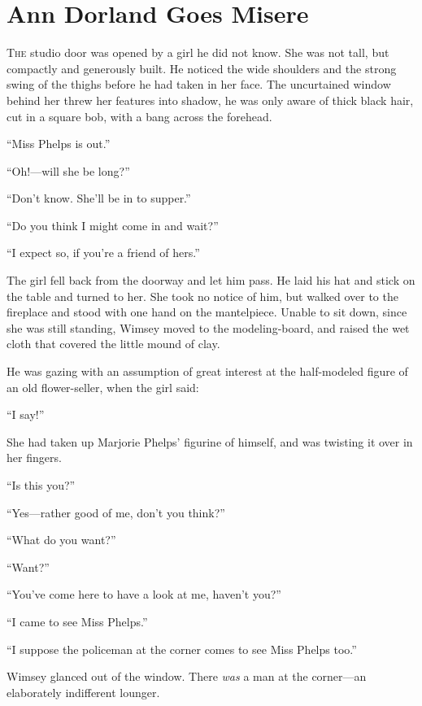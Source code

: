 \chapter{Ann Dorland Goes Misere}

\lettrine[lines=4]{T}{he} studio door was opened by a girl he did not know. She was not tall, but compactly and generously built. He noticed the wide shoulders and the strong swing of the thighs before he had taken in her face. The uncurtained window behind her threw her features into shadow, he was only aware of thick black hair, cut in a square bob, with a bang across the forehead.

\enquote{Miss Phelps is out.}

\enquote{Oh!---will she be long?}

\enquote{Don't know. She'll be in to supper.}

\enquote{Do you think I might come in and wait?}

\enquote{I expect so, if you're a friend of hers.}

The girl fell back from the doorway and let him pass. He laid his hat and stick on the table and turned to her. She took no notice of him, but walked over to the fireplace and stood with one hand on the mantelpiece. Unable to sit down, since she was still standing, Wimsey moved to the modeling-board, and raised the wet cloth that covered the little mound of clay.

He was gazing with an assumption of great interest at the half-modeled figure of an old flower-seller, when the girl said:

\enquote{I say!}

She had taken up Marjorie Phelps' figurine of himself, and was twisting it over in her fingers.

\enquote{Is this you?}

\enquote{Yes\allowbreak---\allowbreak rather good of me, don't you think?}

\enquote{What do you want?}

\enquote{Want?}

\enquote{You've come here to have a look at me, haven't you?}

\enquote{I came to see Miss Phelps.}

\enquote{I suppose the policeman at the corner comes to see Miss Phelps too.}

Wimsey glanced out of the window. There \textit{was} a man at the corner\allowbreak---\allowbreak an elaborately indifferent lounger.

